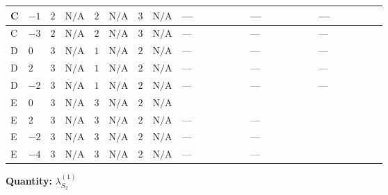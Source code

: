 \documentclass[8pt]{article}
\begin{document}
\begin{landscape}
\begin{longtable}{@{}llcccccc >{\raggedright\arraybackslash}p{0.21\linewidth} >{\raggedright\arraybackslash}p{0.21\linewidth} >{\raggedright\arraybackslash}p{0.21\linewidth}@{}}
\midrule
C & $-1$ & $2$ & $\text{N/A}$ & $2$ & $\text{N/A}$ & $3$ & $\text{N/A}$ & --- & --- & --- \\
\midrule
C & $-3$ & $2$ & $\text{N/A}$ & $2$ & $\text{N/A}$ & $3$ & $\text{N/A}$ & --- & --- & --- \\
\midrule
D & $0$ & $3$ & $\text{N/A}$ & $1$ & $\text{N/A}$ & $2$ & $\text{N/A}$ & --- & --- & --- \\
\midrule
D & $2$ & $3$ & $\text{N/A}$ & $1$ & $\text{N/A}$ & $2$ & $\text{N/A}$ & --- & --- & --- \\
\midrule
D & $-2$ & $3$ & $\text{N/A}$ & $1$ & $\text{N/A}$ & $2$ & $\text{N/A}$ & --- & --- & --- \\
\midrule
E & $0$ & $3$ & $\text{N/A}$ & $3$ & $\text{N/A}$ & $2$ & $\text{N/A}$ & \scriptsize\adjustbox{max width=\linewidth}{$\begin{gathered} 8 {\lambda_{X_{5}}^{(1)}} (3 \left({\lambda_{X_{5}}^{(1)}}\right)^{*}+\left({\lambda_{X_{5}}^{(2)}}\right)^{*})\end{gathered}$} & \scriptsize\adjustbox{max width=\linewidth}{$\begin{gathered} +{\lambda_{X_{5}}^{(2)}} \left(8 \left({\lambda_{X_{5}}^{(1)}}\right)^{*}+\frac{20 \left({\lambda_{X_{5}}^{(2)}}\right)^{*}}{3}\right)\end{gathered}$} & \scriptsize\adjustbox{max width=\linewidth}{$\begin{gathered} +8 {\lambda_{12}^{(1)}} {\lambda_{12}^{(\times)}}\end{gathered}$} \\
\midrule
E & $2$ & $3$ & $\text{N/A}$ & $3$ & $\text{N/A}$ & $2$ & $\text{N/A}$ & --- & --- & \scriptsize\adjustbox{max width=\linewidth}{$\begin{gathered} +8 {\lambda_{12}^{(1)}} {\lambda_{12}^{(\times)}}\end{gathered}$} \\
\midrule
E & $-2$ & $3$ & $\text{N/A}$ & $3$ & $\text{N/A}$ & $2$ & $\text{N/A}$ & --- & --- & \scriptsize\adjustbox{max width=\linewidth}{$\begin{gathered} +8 {\lambda_{12}^{(1)}} {\lambda_{12}^{(\times)}}\end{gathered}$} \\
\midrule
E & $-4$ & $3$ & $\text{N/A}$ & $3$ & $\text{N/A}$ & $2$ & $\text{N/A}$ & --- & --- & \scriptsize\adjustbox{max width=\linewidth}{$\begin{gathered} +8 {\lambda_{12}^{(1)}} {\lambda_{12}^{(\times)}}\end{gathered}$} \\
\midrule
\bottomrule
\end{longtable}
\clearpage
\noindent\textbf{Quantity: }$\lambda_{S_2}^{(1)}$\par\smallskip

\end{landscape}
\end{document}
